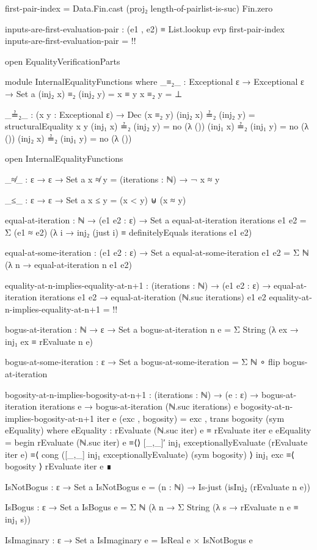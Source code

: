 \documentclass{report}
\begin{document}
\begin{code}
      first-pair-index = Data.Fin.cast (proj₂ length-of-pairlist-is-suc) Fin.zero

      inputs-are-first-evaluation-pair :
        (e1 , e2) ≡ List.lookup evp first-pair-index
      inputs-are-first-evaluation-pair = {!!}

  open EqualityVerificationParts

  module InternalEqualityFunctions where
    _≡₂_ : Exceptional ε → Exceptional ε → Set a
    (inj₂ x) ≡₂ (inj₂ y) = x ≡ y
    x ≡₂ y = ⊥

    _≟₂_ : (x y : Exceptional ε) → Dec (x ≡₂ y)
    (inj₂ x) ≟₂ (inj₂ y) = structuralEquality x y
    (inj₁ x) ≟₂ (inj₂ y) = no (λ ())
    (inj₁ x) ≟₂ (inj₁ y) = no (λ ())
    (inj₂ x) ≟₂ (inj₁ y) = no (λ ())

  open InternalEqualityFunctions

  _≉_ : ε → ε → Set a
  x ≉ y = (iterations : ℕ) → ¬ x ≈ y

  _≤_ : ε → ε → Set a
  x ≤ y = (x < y) ⊎ (x ≈ y)

  equal-at-iteration : ℕ → (e1 e2 : ε) → Set a
  equal-at-iteration iterations e1 e2 =
    Σ (e1 ≈ e2)
      (λ i → inj₂ (just i) ≡ definitelyEquals iterations e1 e2)

  equal-at-some-iteration : (e1 e2 : ε) → Set a
  equal-at-some-iteration e1 e2 = Σ ℕ (λ n → equal-at-iteration n e1 e2)

  equality-at-n-implies-equality-at-n+1 :
    (iterations : ℕ) →
    (e1 e2 : ε) →
    equal-at-iteration iterations e1 e2 →
    equal-at-iteration (ℕ.suc iterations) e1 e2
  equality-at-n-implies-equality-at-n+1 = {!!}

  bogus-at-iteration : ℕ → ε → Set a
  bogus-at-iteration n e = Σ String (λ ex → inj₁ ex ≡ rEvaluate n e)

  bogus-at-some-iteration : ε → Set a
  bogus-at-some-iteration = Σ ℕ ∘ flip bogus-at-iteration

  bogosity-at-n-implies-bogosity-at-n+1 :
    (iterations : ℕ) →
    (e : ε) →
    bogus-at-iteration iterations e →
    bogus-at-iteration (ℕ.suc iterations) e
  bogosity-at-n-implies-bogosity-at-n+1 iter e (exc , bogosity) =
    exc , trans bogosity (sym eEquality)
    where
    eEquality : rEvaluate (ℕ.suc iter) e ≡ rEvaluate iter e
    eEquality = begin
      rEvaluate (ℕ.suc iter) e
        ≡⟨⟩
      [_,_]′ inj₁ exceptionallyEvaluate (rEvaluate iter e)
        ≡⟨ cong ([_,_] inj₁ exceptionallyEvaluate) (sym bogosity) ⟩
      inj₁ exc
        ≡⟨ bogosity ⟩
      rEvaluate iter e ∎

  IsNotBogus : ε → Set a
  IsNotBogus e = (n : ℕ) → Is-just (isInj₂ (rEvaluate n e))

  IsBogus : ε → Set a
  IsBogus e = Σ ℕ (λ n → Σ String (λ s → rEvaluate n e ≡ inj₁ s))

  IsImaginary : ε → Set a
  IsImaginary e = IsReal e × IsNotBogus e
\end{code}
\end{document}
